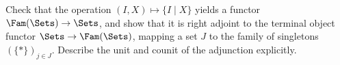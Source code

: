 \begin{exercise}
Check that the operation \((I, X) \mapsto \{I \mid X\}\) yields a functor \(\Fam(\Sets) \to \Sets\), and show that it is right adjoint to the terminal object functor \(\Sets \to \Fam(\Sets)\), mapping a set \(J\) to the family of singletons \((\{*\})_{j \in J}\).
Describe the unit and counit of the adjunction explicitly.
\end{exercise}